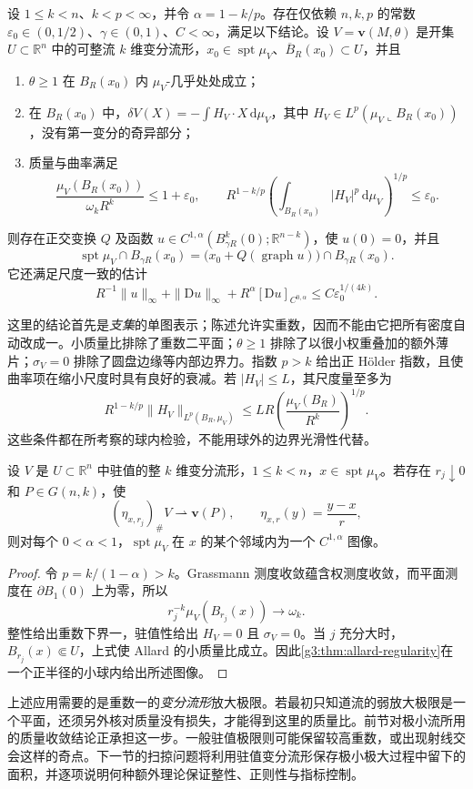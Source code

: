 \begin{theorem}\label{g3:thm:allard-regularity}
	设 \(1\le k<n\)、\(k<p<\infty\)，并令 \(\alpha=1-k/p\)。存在仅依赖 \(n,k,p\) 的常数 \(\varepsilon_0\in(0,1/2)\)、\(\gamma\in(0,1)\)、\(C<\infty\)，满足以下结论。设 \(V=\mathbf v(M,\theta)\) 是开集 \(U\subset\mathbb R^n\) 中的可整流 \(k\) 维变分流形，\(x_0\in\operatorname{spt}\mu_V\)、\(\overline B_R(x_0)\subset U\)，并且
	\begin{enumerate}
		\item \(\theta\ge1\) 在 \(B_R(x_0)\) 内 \(\mu_V\)-几乎处处成立；
		\item 在 \(B_R(x_0)\) 中，\(\delta V(X)=-\int H_V\cdot X\,\mathrm d\mu_V\)，其中 \(H_V\in L^p(\mu_V\llcorner B_R(x_0))\)，没有第一变分的奇异部分；
		\item 质量与曲率满足
		\[
			\frac{\mu_V(B_R(x_0))}{\omega_kR^k}\le1+\varepsilon_0,
			\qquad
			R^{1-k/p}\left(\int_{B_R(x_0)}|H_V|^p\,\mathrm d\mu_V\right)^{1/p}\le\varepsilon_0.
		\]
	\end{enumerate}
	则存在正交变换 \(Q\) 及函数 \(u\in C^{1,\alpha}(B_{\gamma R}^k(0);\mathbb R^{n-k})\)，使 \(u(0)=0\)，并且
	\[
		\operatorname{spt}\mu_V\cap B_{\gamma R}(x_0)
		=\bigl(x_0+Q(\operatorname{graph}u)\bigr)\cap B_{\gamma R}(x_0).
	\]
	它还满足尺度一致的估计
	\[
		R^{-1}\|u\|_\infty+\|\mathrm Du\|_\infty
		+R^\alpha[\mathrm Du]_{C^{0,\alpha}}
		\le C\varepsilon_0^{1/(4k)}.
	\]
\end{theorem}

这里的结论首先是\emph{支集}的单图表示；陈述允许实重数，因而不能由它把所有密度自动改成一。小质量比排除了重数二平面；\(\theta\ge1\) 排除了以很小权重叠加的额外薄片；\(\sigma_V=0\) 排除了圆盘边缘等内部边界力。指数 \(p>k\) 给出正 Hölder 指数，且使曲率项在缩小尺度时具有良好的衰减。若 \(|H_V|\le L\)，其尺度量至多为
\[
	R^{1-k/p}\|H_V\|_{L^p(B_R,\mu_V)}
	\le LR\left(\frac{\mu_V(B_R)}{R^k}\right)^{1/p}.
\]
这些条件都在所考察的球内检验，不能用球外的边界光滑性代替。

\begin{corollary}\label{g3:cor:multiplicity-one-varifold-regularity}
	设 \(V\) 是 \(U\subset\mathbb R^n\) 中驻值的整 \(k\) 维变分流形，\(1\le k<n\)，\(x\in\operatorname{spt}\mu_V\)。若存在 \(r_j\downarrow0\) 和 \(P\in G(n,k)\)，使
	\[
		(\eta_{x,r_j})_\#V\rightharpoonup\mathbf v(P),
		\qquad \eta_{x,r}(y)=\frac{y-x}{r},
	\]
	则对每个 \(0<\alpha<1\)，\(\operatorname{spt}\mu_V\) 在 \(x\) 的某个邻域内为一个 \(C^{1,\alpha}\) 图像。
\end{corollary}
\begin{proof}
	令 \(p=k/(1-\alpha)>k\)。Grassmann 测度收敛蕴含权测度收敛，而平面测度在 \(\partial B_1(0)\) 上为零，所以
	\[
		r_j^{-k}\mu_V(B_{r_j}(x))\longrightarrow\omega_k.
	\]
	整性给出重数下界一，驻值性给出 \(H_V=0\) 且 \(\sigma_V=0\)。当 \(j\) 充分大时，\(B_{r_j}(x)\Subset U\)，上式使 Allard 的小质量比成立。因此\cref{g3:thm:allard-regularity}在一个正半径的小球内给出所述图像。
\end{proof}

上述应用需要的是重数一的\emph{变分流形}放大极限。若最初只知道流的弱放大极限是一个平面，还须另外核对质量没有损失，才能得到这里的质量比。前节对极小流所用的质量收敛结论正承担这一步。一般驻值极限则可能保留较高重数，或出现射线交会这样的奇点。下一节的扫掠问题将利用驻值变分流形保存极小极大过程中留下的面积，并逐项说明何种额外理论保证整性、正则性与指标控制。
